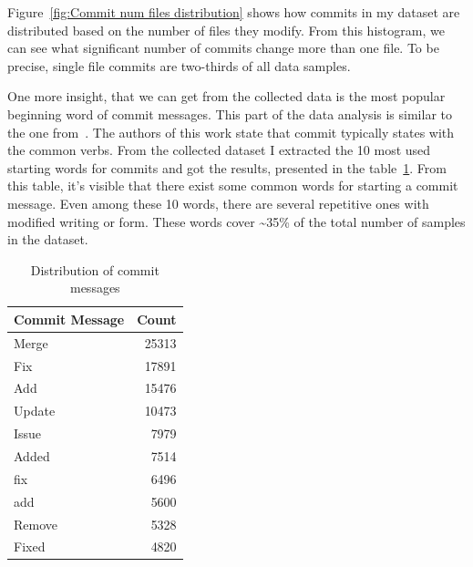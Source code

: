 Figure~{}\ref{fig:Commit num files distribution} shows how commits in my dataset are distributed based on the number of files they modify. From this histogram, we can see what significant number of commits change more than one file. To be precise, single file commits are two-thirds of all data samples. 

One more insight, that we can get from the collected data is the most popular beginning word of commit messages. This part of the data analysis is similar to the one from~{}\cite{jung2021commitbert}. The authors of this work state that commit typically states with the common verbs. From the collected dataset I extracted the 10 most used starting words for commits and got the results, presented in the table~{}\ref{tab:commit_messages}. From this table, it's visible that there exist some common words for starting a commit message. Even among these 10 words, there are several repetitive ones with modified writing or form. These words cover \textasciitilde{}35\% of the total number of samples in the dataset.
\begin{table}[h]
    \centering
    \begin{tabular}{|l|r|} %
    \hline %
    \textbf{Commit Message} & \textbf{Count} \\ 
    \hline %
    Merge     & 25313 \\ \hline %
    Fix       & 17891 \\ \hline %
    Add       & 15476 \\ \hline %
    Update    & 10473 \\ \hline %
    Issue     & 7979  \\ \hline %
    Added     & 7514  \\ \hline %
    fix       & 6496  \\ \hline %
    add       & 5600  \\ \hline %
    Remove    & 5328  \\ \hline %
    Fixed     & 4820  \\ \hline %
    \end{tabular}
    \caption{Distribution of commit messages}\label{tab:commit_messages}
\end{table}

